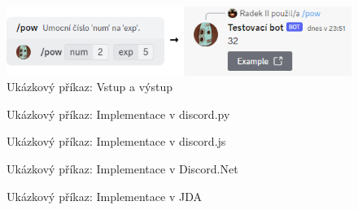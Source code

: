 \documentclass[FM]{tulthesis}
\begin{document}
	\begin{figure}[ht]
		\centering
		\includegraphics[width=\textwidth]{img/ExampleCommand}
		\caption{Ukázkový příkaz: Vstup a výstup}
	\end{figure}
	
	\begin{figure}[ht]
		
		\caption{Ukázkový příkaz: Implementace v discord.py}
	\end{figure}
	
	\begin{figure}[ht]
		
		\caption{Ukázkový příkaz: Implementace v discord.js}
	\end{figure}
	
	\begin{figure}[ht]
		
		\caption{Ukázkový příkaz: Implementace v Discord.Net}
	\end{figure}
	
	\begin{figure}[ht]
		
		\caption{Ukázkový příkaz: Implementace v JDA}
	\end{figure}
	
\end{document}
